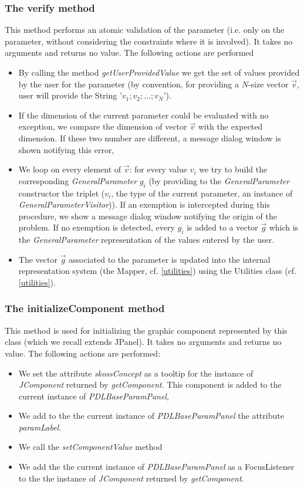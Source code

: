 \documentclass[a4paper,11pt] {ivoa}
\begin{document}
\subsubsection{The verify method}
This method performs an atomic validation of the parameter (i.e. only on the parameter, without considering the constraints where it is involved). It takes no arguments and returns no value. The following actions are performed
\begin{itemize}
\item By calling the method {\it getUserProvidedValue} we get the set of values provided by the user for the parameter (by convention, for providing a $N$-size vector $\vec v$, user will provide the String '$v_1; v_2;...;v_N$'). \item If the dimension of the current parameter could be evaluated with no exception, we compare the dimension of vector $\vec v$ with the expected dimension.  If these two number are different, a message dialog window is shown notifying this error,
\item We loop on every element of $\vec v$: for every value $v_i$ we try to build the corresponding {\it GeneralParameter} $g_i$ (by providing to the {\it GeneralParameter} constructor the triplet ($v_i$, the type of the current parameter, an instance of {\it GeneralParameterVisitor})). If an exemption is intercepted during this procedure, we show a message dialog window notifying the origin of the problem. If no exemption is detected, every $g_i$ is added to a vector $\vec g$ which is the {\it GeneralParameter} representation of the values entered by the user. 
\item The vector $\vec g$ associated to the parameter is updated into the internal representation system (the Mapper, cf. \ref{utilities}) using the Utilities class (cf. \ref{utilities}). 
\end{itemize}

\subsubsection{The initializeComponent method}
This method is used for initializing the graphic component represented by this class (which we recall extends JPanel). It takes no arguments and returns no value.
The following actions are performed:
\begin{itemize}
\item We set the attribute {\it skossConcept} as a tooltip for the instance of {\it JComponent} returned by {\it getComponent}. This component is added to the current instance of {\it PDLBaseParamPanel},
\item We add to the the current instance of {\it PDLBaseParamPanel} the attribute {\it paramLabel}.
\item We call the {\it setComponentValue} method
\item We add the the current instance of {\it PDLBaseParamPanel} as a FocusListener to the the instance of {\it JComponent} returned by {\it getComponent}.
\end{itemize}
\end{document}
